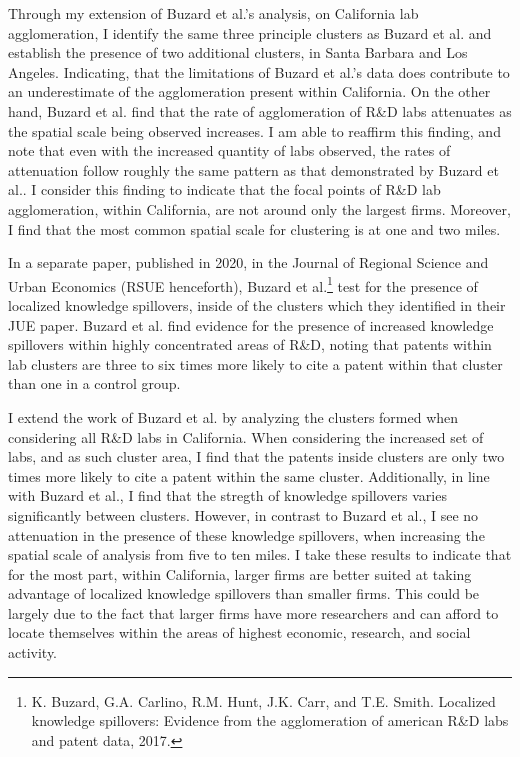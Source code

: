 \documentclass[12pt,letterpaper]{article}
\begin{document}
\par 
 Through my extension of Buzard et al.'s analysis, on California lab agglomeration, I identify the same three principle clusters as Buzard et al. and establish the presence of two additional clusters, in Santa Barbara and Los Angeles. Indicating, that the limitations of Buzard et al.'s data does contribute to an underestimate of the agglomeration present within California. On the other hand, Buzard et al. find that the rate of agglomeration of R\&D labs attenuates as the spatial scale being observed increases. I am able to reaffirm this finding, and note that even with the increased quantity of labs observed, the rates of attenuation follow roughly the same pattern as that demonstrated by Buzard et al.. I consider this finding to indicate that the focal points of R\&D lab agglomeration, within California, are not around only the largest firms. Moreover, I find that the most common spatial scale for clustering is at one and two miles.  
\par
In a separate paper, published in 2020, in the Journal of Regional Science and Urban Economics (RSUE henceforth), Buzard et al.\footnote{K. Buzard, G.A. Carlino, R.M. Hunt, J.K. Carr, and T.E. Smith. Localized knowledge spillovers: Evidence from the agglomeration of american R\&D labs and patent data, 2017.} test for the presence of localized knowledge spillovers, inside of the clusters which they identified in their JUE paper. Buzard et al. find evidence for the presence of increased knowledge spillovers within highly concentrated areas of R\&D, noting that patents within lab clusters are three to six times more likely to cite a patent within that cluster than one in a control group. 
\par 
I extend the work of Buzard et al. by analyzing the clusters formed when considering all R\&D labs in California. When considering the increased set of labs, and as such cluster area, I find that the patents inside clusters are only two times more likely to cite a patent within the same cluster. Additionally, in line with Buzard et al., I find that the stregth of knowledge spillovers varies significantly between clusters. However, in contrast to Buzard et al., I see no attenuation in the presence of these knowledge spillovers, when increasing the spatial scale of analysis from five to ten miles. I take these results to indicate that for the most part, within California, larger firms are better suited at taking advantage of localized knowledge spillovers than smaller firms. This could be largely due to the fact that larger firms have more researchers and can afford to locate themselves within the areas of highest economic, research, and social activity.  
\end{document}
